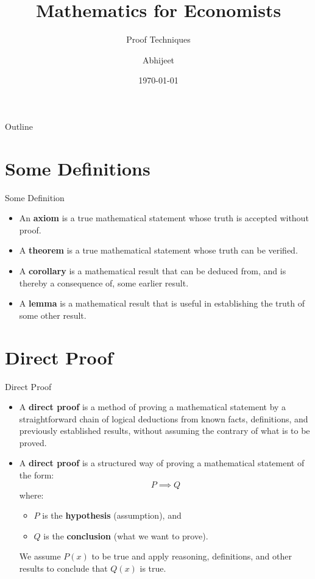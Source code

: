 \documentclass{beamer}
\title{Mathematics for Economists}
\subtitle{Proof Techniques }
\author{Abhijeet}
\institute{IGIDR}
\date{\today}
\begin{document}
\begin{frame}
    \titlepage
\end{frame}

\begin{frame}{Outline}
    \tableofcontents
\end{frame}

\section{Some Definitions}

\begin{frame}{Some Definition}
\begin{itemize}
    \item An \textbf{axiom} is a true mathematical statement whose truth is
    accepted without proof.
    \item A \textbf{theorem} is a true mathematical statement whose truth can be
    verified.
    \item A \textbf{corollary} is a mathematical result that can be deduced
    from, and is thereby a consequence of, some earlier result.
    \item A \textbf{lemma} is a mathematical result that is useful in
    establishing the truth of some other result.
\end{itemize}
\end{frame}

\section{Direct Proof}

\begin{frame}{Direct Proof}
\begin{itemize}
    \item A \textbf{direct proof} is a method of proving a mathematical
    statement by a straightforward chain of logical deductions from known facts,
    definitions, and previously established results, without assuming the
    contrary of what is to be proved.
    \item A \textbf{direct proof} is a structured way of proving a mathematical
    statement of the form:
\[
P \implies Q
\]
where:
\begin{itemize}
    \item \( P \) is the \textbf{hypothesis} (assumption), and
    \item \( Q \) is the \textbf{conclusion} (what we want to prove).
\end{itemize}
We assume $P(x)$ to be true and apply reasoning, definitions, and other results
to conclude that $Q(x)$ is true.
\end{itemize}
\end{frame}
\end{document}
